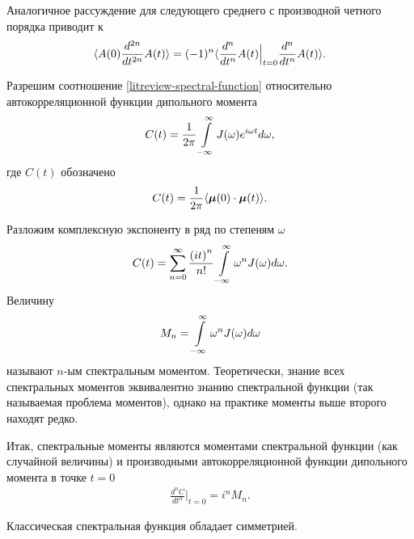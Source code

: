 Аналогичное рассуждение для следующего среднего с производной четного порядка приводит к 
\begin{gather}
    \langle  A(0) \frac{d^{2n}}{dt^{2n}} A(t)  \rangle = (-1)^n \langle  \frac{d^n}{dt^n} A(t)\Big\vert_{t=0} \frac{d^n}{dt^n} A(t)  \rangle. 
\end{gather}

Разрешим соотношение \eqref{litreview-spectral-function} относительно автокорреляционной функции дипольного момента
\begin{gather}
    C(t) = \frac{1}{2\pi} \int\limits_{-\infty}^\infty J(\omega) e^{i \omega t} d \omega, 
\end{gather}
%
где $C(t)$ обозначено
\begin{gather}
    C(t) = \frac{1}{2\pi} \langle \boldsymbol{\mu}(0) \cdot \boldsymbol{\mu}(t) \rangle.
\end{gather}

Разложим комплексную экспоненту в ряд по степеням $\omega$
\begin{gather}
    C(t) = \sum_{n = 0}^\infty \frac{\left( i t\right)^n}{n!} \int\limits_{-\infty}^\infty \omega^n J(\omega) d\omega. 
\end{gather}
%
Величину
\begin{gather}
    M_n = \int\limits_{-\infty}^\infty \omega^n J(\omega) d\omega 
\end{gather}
%
называют $n$-ым спектральным моментом. Теоретически, знание всех спектральных моментов эквивалентно знанию спектральной функции (так называемая проблема моментов), однако на практике моменты выше второго находят редко. \par
Итак, спектральные моменты являются моментами спектральной функции (как случайной величины) и производными автокорреляционной функции дипольного момента в точке $t = 0$
\begin{gather}
    \frac{d^n C}{dt^n} \Bigg\vert_{t = 0} = i^n M_n.
\end{gather}

Классическая спектральная функция обладает симметрией.


